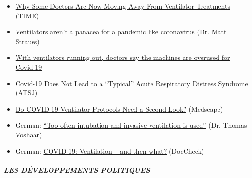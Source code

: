 \begin{itemize}
\tightlist
\item
  \href{https://time.com/5818547/ventilators-coronavirus/}{Why Some
  Doctors Are Now Moving Away From Ventilator Treatments} (TIME)
\item
  \href{https://www.spectator.co.uk/article/Ventilators-aren-t-a-panacea-for-a-pandemic-like-coronavirus}{Ventilators
  aren't a panacea for a pandemic like coronavirus} (Dr. Matt Strauss)
\item
  \href{https://www.statnews.com/2020/04/08/doctors-say-ventilators-overused-for-covid-19/}{With
  ventilators running out, doctors say the machines are overused for
  Covid-19}
\item
  \href{https://www.atsjournals.org/doi/pdf/10.1164/rccm.202003-0817LE}{Covid-19
  Does Not Lead to a ``Typical'' Acute Respiratory Distress Syndrome}
  (ATSJ)
\item
  \href{https://www.medscape.com/viewarticle/928156}{Do COVID-19
  Ventilator Protocols Need a Second Look?} (Medscape)
\item
  German: \href{https://archive.is/KX5IQ}{``Too often intubation and
  invasive ventilation is used''} (Dr. Thomas Voshaar)
\item
  German:
  \href{https://www.doccheck.com/de/detail/articles/26271-covid-19-beatmung-und-dann}{COVID-19:
  Ventilation -- and then what?} (DocCheck)
\end{itemize}

\hypertarget{les-duxe9veloppements-politiques}{%
\subparagraph{\texorpdfstring{\textbf{LES DÉVELOPPEMENTS
POLITIQUES}}{LES DÉVELOPPEMENTS POLITIQUES}}\label{les-duxe9veloppements-politiques}}


